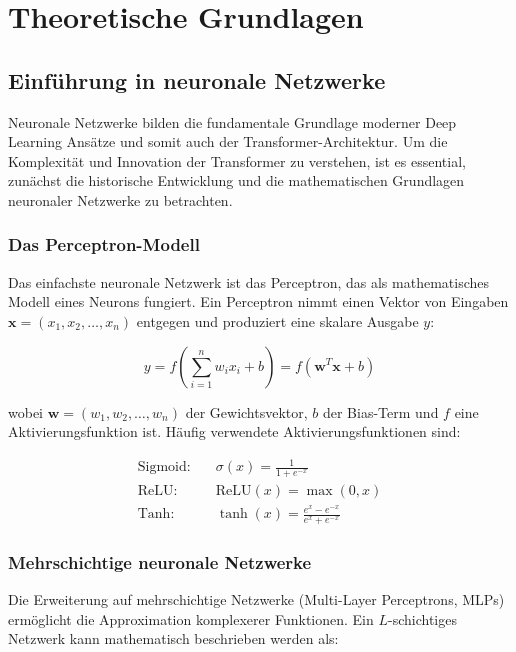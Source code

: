 \chapter{Theoretische Grundlagen}
\label{ch:foundations}

\section{Einführung in neuronale Netzwerke}

Neuronale Netzwerke bilden die fundamentale Grundlage moderner Deep Learning Ansätze und somit auch der Transformer-Architektur. Um die Komplexität und Innovation der Transformer zu verstehen, ist es essential, zunächst die historische Entwicklung und die mathematischen Grundlagen neuronaler Netzwerke zu betrachten.

\subsection{Das Perceptron-Modell}

Das einfachste neuronale Netzwerk ist das Perceptron, das als mathematisches Modell eines Neurons fungiert. Ein Perceptron nimmt einen Vektor von Eingaben $\mathbf{x} = (x_1, x_2, \ldots, x_n)$ entgegen und produziert eine skalare Ausgabe $y$:

\begin{equation}
y = f\left(\sum_{i=1}^{n} w_i x_i + b\right) = f(\mathbf{w}^T \mathbf{x} + b)
\end{equation}

wobei $\mathbf{w} = (w_1, w_2, \ldots, w_n)$ der Gewichtsvektor, $b$ der Bias-Term und $f$ eine Aktivierungsfunktion ist. Häufig verwendete Aktivierungsfunktionen sind:

\begin{align}
\text{Sigmoid:} \quad &\sigma(x) = \frac{1}{1 + e^{-x}} \\
\text{ReLU:} \quad &\text{ReLU}(x) = \max(0, x) \\
\text{Tanh:} \quad &\tanh(x) = \frac{e^x - e^{-x}}{e^x + e^{-x}}
\end{align}

\subsection{Mehrschichtige neuronale Netzwerke}

Die Erweiterung auf mehrschichtige Netzwerke (Multi-Layer Perceptrons, MLPs) ermöglicht die Approximation komplexerer Funktionen. Ein $L$-schichtiges Netzwerk kann mathematisch beschrieben werden als:

